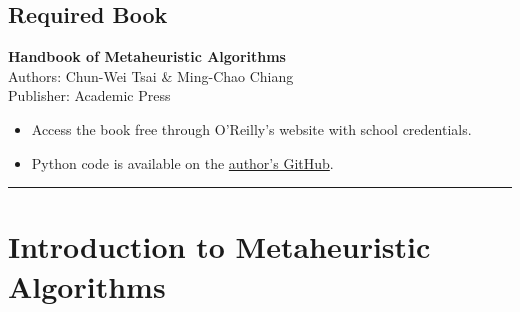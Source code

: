 \documentclass[
  letterpaper,
  DIV=11,
  numbers=noendperiod]{scrreprt}
\providecommand{\tightlist}{%
  \setlength{\itemsep}{0pt}\setlength{\parskip}{0pt}}\usepackage{longtable,booktabs,array}
\begin{document}
\section{Required Book}\label{required-book}

\textbf{Handbook of Metaheuristic Algorithms}\\
Authors: Chun-Wei Tsai \& Ming-Chao Chiang\\
Publisher: Academic Press\\

\begin{itemize}
\tightlist
\item
  Access the book free through O'Reilly's website with school
  credentials.
\item
  Python code is available on the
  \href{https://github.com/cwtsaiai/metaheuristics_2023/tree/main/src/python}{author's
  GitHub}.
\end{itemize}

\begin{center}\rule{0.5\linewidth}{0.5pt}\end{center}


\chapter{Introduction to Metaheuristic
Algorithms}\label{introduction-to-metaheuristic-algorithms}
\end{document}
